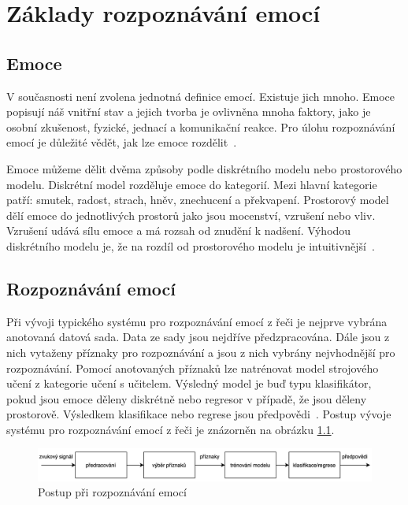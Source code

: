 \documentclass[FM,BP]{tulthesis}
\begin{document}
\chapter{Základy rozpoznávání emocí}

\section{Emoce} %
V současnosti není zvolena jednotná definice emocí. Existuje jich mnoho. Emoce popisují náš vnitřní stav a jejich tvorba je ovlivněna mnoha faktory, jako je osobní zkušenost, fyzické, jednací a komunikační reakce. Pro úlohu rozpoznávání emocí je důležité vědět, jak lze emoce rozdělit~\cite{DBLP:journals/speech/AkcayO20}.

Emoce můžeme dělit dvěma způsoby podle diskrétního modelu nebo prostorového modelu. Diskrétní model rozděluje emoce do kategorií. Mezi hlavní kategorie patří: smutek, radost, strach, hněv, znechucení a překvapení. Prostorový model dělí emoce do jednotlivých prostorů jako jsou mocenství, vzrušení nebo vliv. Vzrušení udává sílu emoce a má rozsah od znudění k nadšení. Výhodou diskrétního modelu je, že na rozdíl od prostorového modelu je intuitivnější~\cite{DBLP:journals/speech/AkcayO20}.

\section{Rozpoznávání emocí} %
Při vývoji typického systému pro rozpoznávání emocí z řeči je nejprve vybrána anotovaná datová sada. Data ze sady jsou nejdříve předzpracována. Dále jsou z nich vytaženy příznaky pro rozpoznávání a jsou z nich vybrány nejvhodnější pro rozpoznávání. Pomocí anotovaných příznaků lze natrénovat model strojového učení z kategorie učení s učitelem. Výsledný model je buď typu klasifikátor, pokud jsou emoce děleny diskrétně nebo regresor v případě, že jsou děleny prostorově. Výsledkem klasifikace nebo regrese jsou předpovědi~\cite{konar_chakraborty_2015}. Postup vývoje systému pro rozpoznávání emocí z řeči je znázorněn na obrázku \ref{fig:ser_pipeline}.

\begin{figure}[htbp]
\centerline{\includegraphics[width=\textwidth,height=\textheight,keepaspectratio]{speech_emotion_recognition-pipeline.png}}
\caption{Postup při rozpoznávání emocí}
\label{fig:ser_pipeline}
\end{figure}
\FloatBarrier
\end{document}
